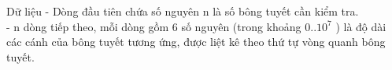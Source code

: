Dữ liệu
- Dòng đầu tiên chứa số nguyên n là số bông tuyết cần kiểm tra.   
\\   - n dòng tiếp theo, mỗi dòng gồm 6 số nguyên (trong khoảng 0..$10^{7}$   ) là độ dài các cánh của bông tuyết tương ứng, được liệt kê theo thứ tự vòng quanh bông tuyết.